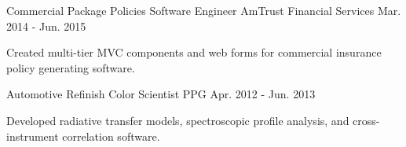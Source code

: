 \begin{cventries}
  \cventry
    {Commercial Package Policies}
    {Software Engineer} %
    {AmTrust Financial Services}
    {Mar. 2014 - Jun. 2015}
    {
      \begin{cvcompactparagraph}
        Created multi-tier MVC components and web forms for commercial insurance policy generating software.
      \end{cvcompactparagraph}
    }

  \cventry
    {Automotive Refinish} %
    {Color Scientist} %
    {PPG} %
    {Apr. 2012 - Jun. 2013}
    {
      \begin{cvcompactparagraph}
        Developed radiative transfer models, spectroscopic profile analysis, and cross-instrument correlation software.
      \end{cvcompactparagraph}
    }

\end{cventries}
